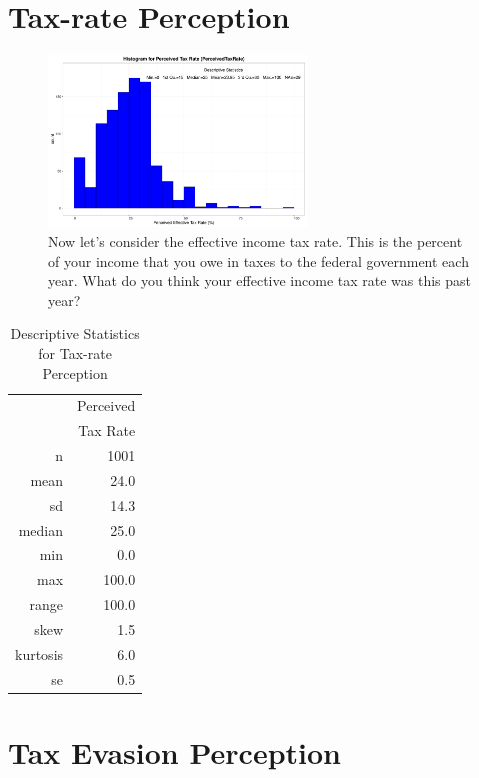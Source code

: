 \documentclass{NSF_proposal_mod}
\begin{document}
\section{Tax-rate Perception}

\begin{figure}[h!]
\centering
\includegraphics[width = 0.61\textwidth]{HistPerceivedTaxRate.pdf}
\caption{Now let's consider the effective income tax rate.  This is the percent of your income that you owe in taxes to the federal government each year. What do you think your effective income tax rate was this past year?}
\label{Fig2}
\end{figure}
\begin{table}[ht]
\centering
\begin{tabular}{rr}
  \hline
 & Perceived\\ 
& Tax Rate\\
  \hline
  n & 1001 \\ 
  mean & 24.0 \\ 
  sd & 14.3 \\ 
  median & 25.0 \\ 
  min & 0.0 \\ 
  max & 100.0 \\ 
  range & 100.0 \\ 
  skew & 1.5 \\ 
  kurtosis & 6.0 \\ 
  se & 0.5 \\ 
   \hline
\end{tabular}
\caption{Descriptive Statistics for Tax-rate Perception} 
\end{table}

\newpage
\section{Tax Evasion Perception}
\end{document}
